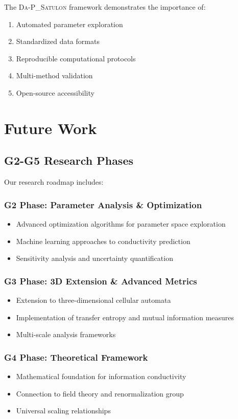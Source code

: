 \documentclass[twocolumn,showpacs,preprintnumbers,amsmath,amssymb,prb]{revtex4-2}
\newcommand{\satulon}{\textsc{Da-P\_Satulon}}
\begin{document}
The \satulon{} framework demonstrates the importance of:
\begin{enumerate}
\item Automated parameter exploration
\item Standardized data formats
\item Reproducible computational protocols
\item Multi-method validation
\item Open-source accessibility
\end{enumerate}

\section{Future Work}
\label{sec:future}

\subsection{G2-G5 Research Phases}

Our research roadmap includes:

\subsubsection{G2 Phase: Parameter Analysis \& Optimization}
\begin{itemize}
\item Advanced optimization algorithms for parameter space exploration
\item Machine learning approaches to conductivity prediction
\item Sensitivity analysis and uncertainty quantification
\end{itemize}

\subsubsection{G3 Phase: 3D Extension \& Advanced Metrics}
\begin{itemize}
\item Extension to three-dimensional cellular automata
\item Implementation of transfer entropy and mutual information measures
\item Multi-scale analysis frameworks
\end{itemize}

\subsubsection{G4 Phase: Theoretical Framework}
\begin{itemize}
\item Mathematical foundation for information conductivity
\item Connection to field theory and renormalization group
\item Universal scaling relationships
\end{itemize}
\end{document}
